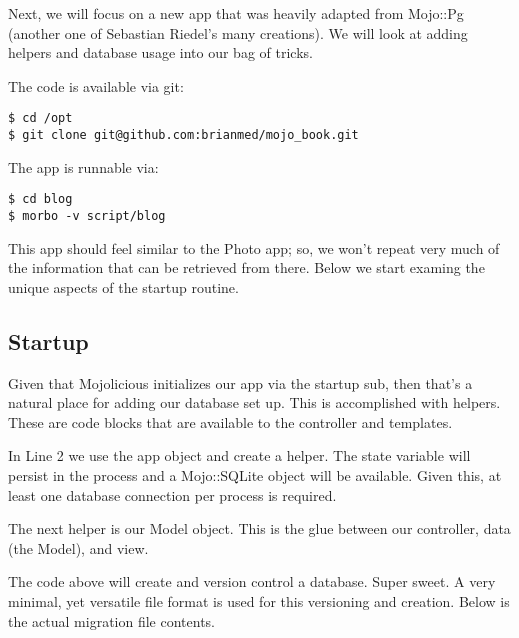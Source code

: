 \documentclass[14pt]{extreport}
\newcommand\Small{\fontsize{12}{13.0}\fontencoding{T1}\selectfont}
\newcommand*\LSTfont{\Small\ttfamily\SetTracking{encoding=*}{-60}\lsstyle}
\begin{document}
Next, we will focus on a new app that was heavily adapted from Mojo::Pg
(another one of Sebastian Riedel's many creations).  We will look at adding
helpers and database usage into our bag of tricks.

The code is available via git:

\begin{lstlisting}[style=BashOutputStyle]
$ cd /opt
$ git clone git@github.com:brianmed/mojo_book.git
\end{lstlisting}

The app is runnable via:

\begin{lstlisting}[style=BashInputStyle]
$ cd blog
$ morbo -v script/blog
\end{lstlisting}

This app should feel similar to the Photo app; so, we won't repeat very much of
the information that can be retrieved from there.  Below we start examing the
unique aspects of the startup routine.

\subsection{Startup}

Given that Mojolicious initializes our app via the startup sub, then that's a
natural place for adding our database set up.  This is accomplished with
helpers. These are code blocks that are available to the controller and
templates.



In Line 2 we use the app object and create a helper.  The state variable will
persist in the process and a Mojo::SQLite object will be available.  Given
this, at least one database connection per process is required.

The next helper is our Model object.  This is the glue between our controller,
data (the Model), and view.



The code above will create and version control a database.  Super sweet.  A
very minimal, yet versatile file format is used for this versioning and
creation.  Below is the actual migration file contents.


\end{document}
